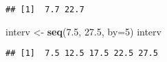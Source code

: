 \documentclass[
]{article}
\newenvironment{Shaded}{\begin{snugshade}}{\end{snugshade}}
\newcommand{\DataTypeTok}[1]{\textcolor[rgb]{0.13,0.29,0.53}{#1}}
\newcommand{\DecValTok}[1]{\textcolor[rgb]{0.00,0.00,0.81}{#1}}
\newcommand{\FloatTok}[1]{\textcolor[rgb]{0.00,0.00,0.81}{#1}}
\newcommand{\KeywordTok}[1]{\textcolor[rgb]{0.13,0.29,0.53}{\textbf{#1}}}
\newcommand{\NormalTok}[1]{#1}
\newcommand{\StringTok}[1]{\textcolor[rgb]{0.31,0.60,0.02}{#1}}
\begin{document}
\begin{verbatim}
## [1]  7.7 22.7
\end{verbatim}

\begin{Shaded}
\begin{Highlighting}[]
\NormalTok{ interv <-}\StringTok{ }\KeywordTok{seq}\NormalTok{(}\FloatTok{7.5}\NormalTok{, }\FloatTok{27.5}\NormalTok{, }\DataTypeTok{by=}\DecValTok{5}\NormalTok{)}
\NormalTok{ interv}
\end{Highlighting}
\end{Shaded}

\begin{verbatim}
## [1]  7.5 12.5 17.5 22.5 27.5
\end{verbatim}
\end{document}
